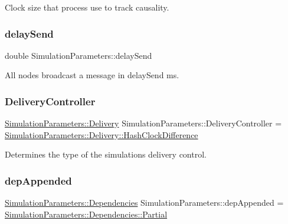 Clock size that process use to track causality. 

\mbox{\label{class_simulation_parameters_ae02521fdf6d81eff5e620a6a021106d3}} 
\subsubsection{\texorpdfstring{delay\+Send}{delaySend}}
{\footnotesize\ttfamily double Simulation\+Parameters\+::delay\+Send}



All nodes broadcast a message in delay\+Send ms. 

\mbox{\label{class_simulation_parameters_ab379e91439dd9d4179096d30f930d459}} 
\subsubsection{\texorpdfstring{Delivery\+Controller}{DeliveryController}}
{\footnotesize\ttfamily \hyperlink{class_simulation_parameters_ae08444273809241f502aa422205f7307}{Simulation\+Parameters\+::\+Delivery} Simulation\+Parameters\+::\+Delivery\+Controller = \hyperlink{class_simulation_parameters_ae08444273809241f502aa422205f7307a9a46ad9fb926b8b78ba9395f96aa6af0}{Simulation\+Parameters\+::\+Delivery\+::\+Hash\+Clock\+Difference}\hspace{0.3cm}{\ttfamily [static]}}



Determines the type of the simulation\textquotesingle{}s delivery control. 

\mbox{\label{class_simulation_parameters_ad0c30ae3194fb07ca8a456331fce1add}} 
\subsubsection{\texorpdfstring{dep\+Appended}{depAppended}}
{\footnotesize\ttfamily \hyperlink{class_simulation_parameters_afb3b6aaecd4b19ef1991c870c8402dff}{Simulation\+Parameters\+::\+Dependencies} Simulation\+Parameters\+::dep\+Appended = \hyperlink{class_simulation_parameters_afb3b6aaecd4b19ef1991c870c8402dffa44ffd38a6dea695cbe2b34efdcc6cf27}{Simulation\+Parameters\+::\+Dependencies\+::\+Partial}\hspace{0.3cm}{\ttfamily [static]}}



